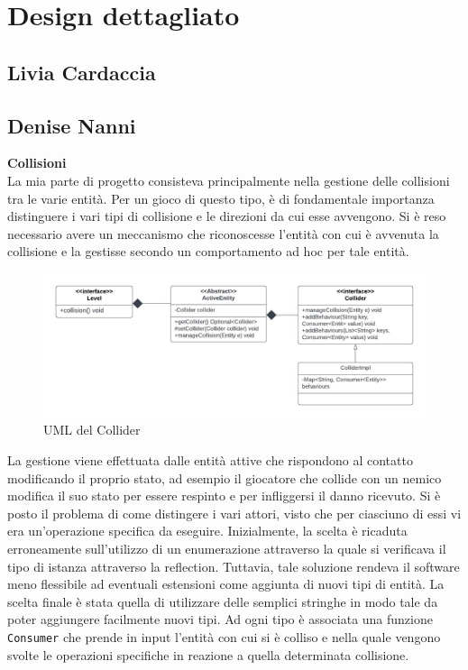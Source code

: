 \documentclass[a4paper,12pt]{report}
\begin{document}
\section{Design dettagliato}
\subsection{Livia Cardaccia}

\subsection{Denise Nanni}
\textbf{Collisioni}
\\
La mia parte di progetto consisteva principalmente nella gestione delle collisioni tra le varie entità.
Per un gioco di questo tipo, è di fondamentale importanza distinguere i vari tipi di collisione e le direzioni da cui esse avvengono. Si è reso necessario avere un meccanismo che riconoscesse l'entità con cui è avvenuta la collisione e la gestisse secondo un comportamento ad hoc per tale entità.

\begin{figure}[ht]
\includegraphics[width=1\textwidth]{umlCollider.jpg}
\caption{UML del Collider}
\label{fig:schgen}
\end{figure}

La gestione viene effettuata dalle entità attive che rispondono al contatto modificando il proprio stato, ad esempio il giocatore che collide con un nemico modifica il suo stato per essere respinto e per infliggersi il danno ricevuto.
Si è posto il problema di come distingere i vari attori, visto che per ciasciuno di essi vi era un'operazione specifica da eseguire. Inizialmente, la scelta è ricaduta erroneamente sull'utilizzo di un enumerazione attraverso la quale si verificava il tipo di istanza attraverso la reflection. Tuttavia, tale soluzione rendeva il software meno flessibile ad eventuali estensioni come aggiunta di nuovi tipi di entità.
La scelta finale è stata quella di utilizzare delle semplici stringhe in modo tale da poter aggiungere facilmente nuovi tipi. Ad ogni tipo è associata una funzione \texttt{Consumer} che prende in input l'entità con cui si è colliso e nella quale vengono svolte le operazioni specifiche in reazione a quella determinata collisione.
\end{document}
